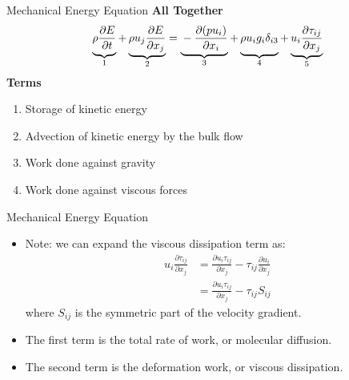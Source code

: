 \begin{frame}{Mechanical Energy Equation}
\textbf{All Together}
$$
\underbrace{\vphantom{-\frac{1}{\rho}\vv{\nabla}p}\rho \frac{\partial E}{\partial t}}_{1} + \underbrace{\vphantom{-\frac{1}{\rho}\vv{\nabla}p}\rho u_j\frac{\partial E}{\partial x_j}}_{2}= \underbrace{\vphantom{-\frac{1}{\rho}\vv{\nabla}p}-\frac{\partial (pu_i)}{\partial x_i}}_{3} + \underbrace{\vphantom{-\frac{1}{\rho}\vv{\nabla}p}\rho u_i g_i \delta_{i3}}_{4} + \underbrace{\vphantom{-\frac{1}{\rho}\vv{\nabla}p}u_i\frac{\partial \tau_{ij}}{\partial x_j}}_{5}$$
\textbf{Terms}
\begin{enumerate}
	\item Storage of kinetic energy
	\item Advection of kinetic energy by the bulk flow
	\item Work done against gravity
	\item Work done against viscous forces
\end{enumerate}
\end{frame}
\begin{frame}{Mechanical Energy Equation}

\begin{itemize}
	\item Note: we can expand the viscous dissipation term as:
	\begin{align*}
	u_i\frac{\partial \tau_{ij}}{\partial x_j} &= \frac{\partial u_i \tau_{ij}}{\partial x_j} - \tau_{ij}\frac{\partial u_i}{\partial x_j}\\
	&=\frac{\partial u_i \tau_{ij}}{\partial x_j} - \tau_{ij}S_{ij}
	\end{align*}
	where $S_{ij}$ is the symmetric part of the velocity gradient.
	\item The first term is the total rate of work, or molecular diffusion.
	\item The second term is the deformation work, or viscous dissipation.
\end{itemize}
\end{frame}
